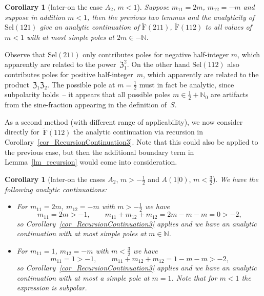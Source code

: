 \documentclass[10pt,a4paper]{amsart}
\numberwithin{equation}{section}
\newtheorem{cor}[teo]{Corollary}
\newcommand{\N}{\mathbb{N}}
\newcommand{\zem}{\mathfrak{Z}}
\newcommand{\Sel}{\mathrm{Sel}}
\newcommand{\rFp}{\tilde{\mathrm{F}}}
\begin{document}
\begin{cor}[later-on the case $A_2$, $m<1$]\label{cor_A2Method1}
	Suppose $m_{11}=2m$, $m_{12}=-m$ and suppose in addition $m<1$, then the previous two lemmas and the analyticity of $\Sel(121)$ give an analytic continuation of $\rFp(211)$, $\rFp(112)$ to all values of $m<1$ with at most simple poles at $2m\in-\N$.
\end{cor}
Observe that $\Sel(211)$ only contributes poles for negative half-integer $m$, which apparently are related to the power~$\zem_1^2$. On the other hand $\Sel(112)$ also contributes poles for positive half-integer~$m$, which apparently are related to the product~$\zem_1\zem_2$. The possible pole at $m=\frac{1}{2}$ must in fact be analytic, since subpolarity holds~-- it appears that all possible poles $m\in\frac{1}{2}+\N_0$ are artifacts from the sine-fraction appearing in the definition of~$S$.

As a second method (with different range of applicability), we now consider directly for~$\rFp(112)$ the analytic continuation via recursion in Corollary~\ref{cor_RecursionContinuation3}. Note that this could also be applied to the previous case, but then the additional boundary term in Lemma~\ref{lm_recursion} would come into consideration.
\begin{cor}[later-on the cases $A_2$, $m>-\frac{1}{2}$ and $A(1|0)$, $m<\frac{3}{2}$]\label{cor_A2Method2}
	We have the following analytic continuations:
\begin{itemize}\itemsep=0pt
	\item For $m_{11}=2m$, $m_{12}=-m$ with $m>-\frac{1}{2}$ we have \[m_{11}=2m>-1,\qquad
	m_{11}+m_{12}+m_{12}=2m-m-m=0>-2,\]
	so Corollary~{\rm \ref{cor_RecursionContinuation3}} applies and we have an analytic continuation with at most simple poles at $m\in\N$.
	\item For $m_{11}=1$, $m_{12}=-m$ with $m<\frac{3}{2}$ we have
	\[m_{11}=1>-1,\qquad
	m_{11}+m_{12}+m_{12}=1-m-m>-2,\]
	so Corollary~{\rm \ref{cor_RecursionContinuation3}} applies and we have an analytic continuation with at most a simple pole at $m=1$. Note that for $m<1$ the expression is subpolar.
\end{itemize}
\end{cor}
\end{document}
